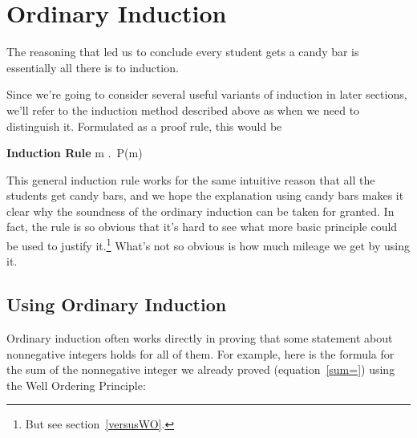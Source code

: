 \section{Ordinary Induction}

The reasoning that led us to conclude every student gets a candy bar is 
essentially all there is to induction.
\iffalse
So our claim that all the Professor's students get a candy bar was simply
an application of the Induction Rule with $P(n)$ defined to be the
predicate, ``student $n$ gets a candy bar.''
\fi

Since we're going to consider several useful variants of induction in
later sections, we'll refer to the induction method described above as
 when we need to distinguish it.  Formulated as 
a proof rule, this would be
\begin{rul*} \textbf{Induction Rule}
{\forall m \in \naturals.\, P(m)}
\end{rul*}

This general induction rule works for the same intuitive reason that all
the students get candy bars, and we hope the explanation using candy bars
makes it clear why the soundness of the ordinary induction can be taken
for granted.  In fact, the rule is so obvious that it's hard to see what
more basic principle could be used to justify it.\footnote{But see
section~\ref{versusWO}.}  What's not so obvious is how much mileage 
we get by using it.

\subsection{Using Ordinary Induction}

Ordinary induction often works directly in proving that some statement
about nonnegative integers holds for all of them.  For example, here is
the formula for the sum of the nonnegative integer we already proved
(equation~\eqref{sum=}) using the Well Ordering Principle:

